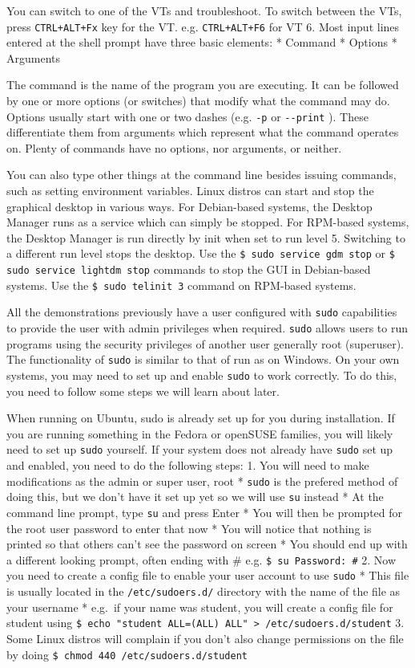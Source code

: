 You can switch to one of the VTs and troubleshoot. To switch between the
VTs, press \texttt{CTRL+ALT+Fx} key for the VT. e.g.
\texttt{CTRL+ALT+F6} for VT 6. Most input lines entered at the shell
prompt have three basic elements: * Command * Options * Arguments

The command is the name of the program you are executing. It can be
followed by one or more options (or switches) that modify what the
command may do. Options usually start with one or two dashes (e.g.
\texttt{-p} or \texttt{-\/-print} ). These differentiate them from
arguments which represent what the command operates on. Plenty of
commands have no options, nor arguments, or neither.

You can also type other things at the command line besides issuing
commands, such as setting environment variables. Linux distros can start
and stop the graphical desktop in various ways. For Debian-based
systems, the Desktop Manager runs as a service which can simply be
stopped. For RPM-based systems, the Desktop Manager is run directly by
init when set to run level 5. Switching to a different run level stops
the desktop. Use the \texttt{\$ sudo service gdm stop} or
\texttt{\$ sudo service lightdm stop} commands to stop the GUI in
Debian-based systems. Use the \texttt{\$ sudo telinit 3} command on
RPM-based systems.

All the demonstrations previously have a user configured with
\texttt{sudo} capabilities to provide the user with admin privileges
when required. \texttt{sudo} allows users to run programs using the
security privileges of another user generally root (superuser). The
functionality of \texttt{sudo} is similar to that of run as on Windows.
On your own systems, you may need to set up and enable \texttt{sudo} to
work correctly. To do this, you need to follow some steps we will learn
about later.

When running on Ubuntu, sudo is already set up for you during
installation. If you are running something in the Fedora or openSUSE
families, you will likely need to set up \texttt{sudo} yourself. If your
system does not already have \texttt{sudo} set up and enabled, you need
to do the following steps: 1. You will need to make modifications as the
admin or super user, root * \texttt{sudo} is the prefered method of
doing this, but we don't have it set up yet so we will use \texttt{su}
instead * At the command line prompt, type \texttt{su} and press Enter *
You will then be prompted for the root user password to enter that now *
You will notice that nothing is printed so that others can't see the
password on screen * You should end up with a different looking prompt,
often ending with \# e.g. \texttt{\$ su Password: \#} 2. Now you need to
create a config file to enable your user account to use \texttt{sudo} *
This file is usually located in the \texttt{/etc/sudoers.d/} directory
with the name of the file as your username * e.g.~if your name was
student, you will create a config file for student using
\texttt{\$ echo "student ALL=(ALL) ALL" \textgreater{} /etc/sudoers.d/student}
3. Some Linux distros will complain if you don't also change permissions
on the file by doing \texttt{\$ chmod 440 /etc/sudoers.d/student}

